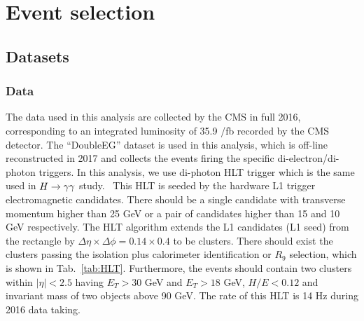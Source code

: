 \chapter{Event selection} %

\label{Chapter4} %

\section{Datasets}

\subsection{Data}
The data used in this analysis are collected by the CMS in full 2016, corresponding to an integrated luminosity of 35.9 /fb recorded by the CMS detector.
The ``DoubleEG'' dataset is used in this analysis, which is off-line reconstructed in 2017 and collects the events firing the specific di-electron/di-photon triggers. %
In this analysis, we use di-photon HLT trigger which is the same used in $H\to\gamma\gamma$ study.~\cite{1804.02716}
This HLT is seeded by the hardware L1 trigger electromagnetic candidates.
There should be a single candidate with transverse momentum higher than 25 GeV or a pair of candidates higher than 15 and 10 GeV respectively.
The HLT algorithm extends the L1 candidates (L1 seed) from the rectangle by $\Delta \eta \times \Delta \phi = 0.14 \times 0.4$ to be clusters.
There should exist the clusters passing the isolation plus calorimeter identification or $R_{9}$ selection, which is shown in Tab.~\ref{tab:HLT}.
Furthermore, the events should contain two clusters within $|\eta|<2.5$ having $E_{T}>30$ GeV and $E_{T}>18$ GeV, $H/E < 0.12$ and invariant mass of two objects above 90 GeV.
The rate of this HLT is 14 Hz during 2016 data taking.


